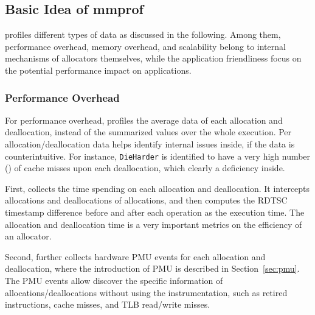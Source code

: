 \subsection{Basic Idea of mmprof}
\MP{} profiles different types of data as discussed in the following. Among them,  performance overhead, memory overhead, and scalability belong to internal mechanisms of allocators themselves, while the application friendliness focus on the potential performance impact on applications.  
  
\subsubsection{Performance Overhead}

For performance overhead, \MP{} profiles the average data of each allocation and deallocation, instead of the summarized values over the whole execution. Per allocation/deallocation data helps identify internal issues inside, if the data is counterintuitive. For instance, \texttt{DieHarder} is identified to have a very high number () of cache misses upon each deallocation, which clearly a deficiency inside. 

First, \MP{} collects the time spending on each allocation and deallocation. It intercepts allocations and deallocations of allocations, and then computes the RDTSC timestamp difference before and after each operation as the execution time. The allocation and deallocation time is a very important metrics on the efficiency of an allocator.  

% 

Second, \MP{} further collects hardware PMU events for each allocation and deallocation, where the introduction of PMU is described in Section~\ref{sec:pmu}. The PMU events allow \MP{} discover the specific information of allocations/deallocations without using the instrumentation, such as retired instructions, cache misses, and TLB read/write misses. 



